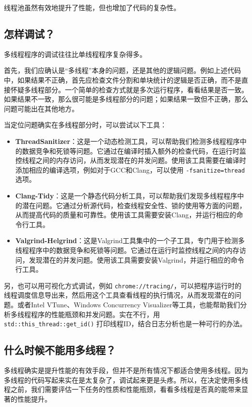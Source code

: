 线程池虽然有效地提升了性能，但也增加了代码的复杂性。

\subsection{怎样调试？}
多线程程序的调试往往比单线程程序复杂得多。

首先，我们应确认是“多线程”本身的问题，还是其他的逻辑问题。例如上述代码中，如果结果不正确，首先应检查文件分割和单块统计的逻辑是否正确，而不是直接怀疑多线程部分。一个简单的检查方式就是多次运行程序，看看结果是否一致。如果结果不一致，那么很可能是多线程部分的问题；如果结果一致但不正确，那么问题可能出在其他地方。

当定位问题确实在多线程部分时，可以尝试以下工具：
\begin{itemize}
    \item \textbf{ThreadSanitizer}：这是一个动态检测工具，可以帮助我们检测多线程程序中的数据竞争和死锁等问题。它通过在编译时插入额外的检查代码，在运行时监控线程之间的内存访问，从而发现潜在的并发问题。使用该工具需要在编译时添加相应的编译选项，例如对于GCC和Clang，可以使用 \verb|-fsanitize=thread| 选项。
    \item \textbf{Clang-Tidy}：这是一个静态代码分析工具，可以帮助我们发现多线程程序中的潜在问题。它通过分析源代码，检查线程安全性、锁的使用等方面的问题，从而提高代码的质量和可靠性。使用该工具需要安装Clang，并运行相应的命令行工具。
    \item \textbf{Valgrind-Helgrind}：这是Valgrind工具集中的一个子工具，专门用于检测多线程程序中的数据竞争和死锁等问题。它通过在运行时监控线程之间的内存访问，发现潜在的并发问题。使用该工具需要安装Valgrind，并运行相应的命令行工具。
\end{itemize}

另，也可以用可视化方式调试，例如 \verb|chrome://tracing/|，可以把程序运行时的线程调度信息导出来，然后用这个工具查看线程的执行情况，从而发现潜在的问题。或者Intel VTune、Windows Concurrency Visualizer等工具，也能帮助我们分析多线程程序的性能瓶颈和并发问题。实在不行，用 \verb|std::this_thread::get_id()| 打印线程ID，结合日志分析也是一种可行的办法。

\subsection{什么时候不能用多线程？}

多线程确实是提升性能的有效手段，但并不是所有情况下都适合使用多线程。因为多线程的代码写起来实在是太复杂了，调试起来更是头疼。所以，在决定使用多线程之前，我们需要评估一下任务的性质和性能瓶颈，看看多线程是否真的能带来显著的性能提升。

